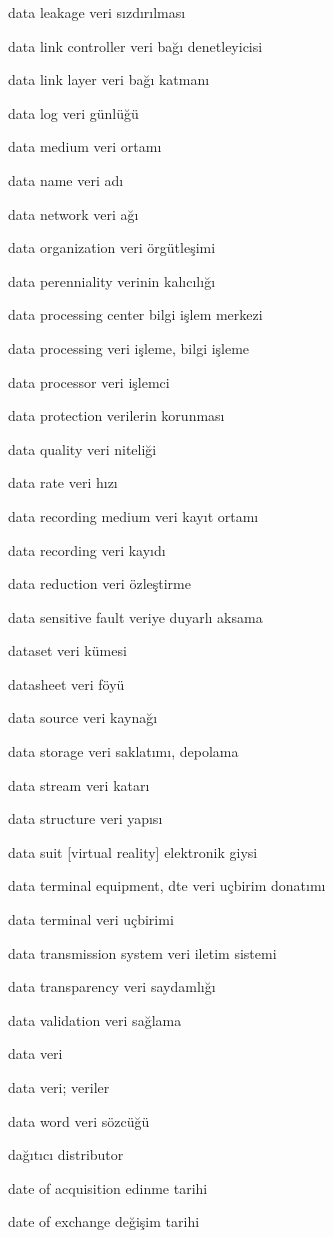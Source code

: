 \documentclass[12pt,fleqn]{article}\usepackage{../../common}
\begin{document}
data leakage veri sızdırılması

data link controller veri bağı denetleyicisi

data link layer veri bağı katmanı

data log veri günlüğü

data medium veri ortamı

data name veri adı

data network veri ağı

data organization veri örgütleşimi

data perenniality verinin kalıcılığı

data processing center bilgi işlem merkezi

data processing veri işleme, bilgi işleme

data processor veri işlemci

data protection verilerin korunması

data quality veri niteliği

data rate veri hızı

data recording medium veri kayıt ortamı

data recording veri kayıdı

data reduction veri özleştirme

data sensitive fault veriye duyarlı aksama

dataset veri kümesi

datasheet veri föyü

data source veri kaynağı

data storage veri saklatımı, depolama

data stream veri katarı

data structure veri yapısı

data suit [virtual reality] elektronik giysi

data terminal equipment, dte veri uçbirim donatımı

data terminal veri uçbirimi

data transmission system veri iletim sistemi

data transparency veri saydamlığı

data validation veri sağlama

data veri

data veri; veriler

data word veri sözcüğü

dağıtıcı distributor

date of acquisition edinme tarihi

date of exchange değişim tarihi
\end{document}
